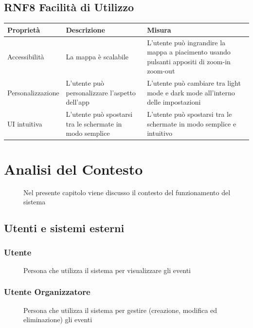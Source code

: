 \documentclass{article}
\let\origthesubsection\thesubsection
\begin{document}
\subsection{RNF8 Facilità di Utilizzo}
\begin{center}
    \begin{longtable}{|p{4cm}|p{8cm}|p{4cm}|}
        \hline
        Proprietà         & Descrizione                                              & Misura                                                                                     \\
        \hline
        Accessibilità     & La mappa è scalabile                                     & L'utente può ingrandire la mappa a piacimento usando pulsanti appositi di zoom-in zoom-out \\
        \hline
        Personalizzazione & L'utente può personalizzare l'aspetto dell'app           & L'utente può cambiare tra light mode e dark mode all'interno delle impostazioni            \\
        \hline
        UI intuitiva      & L'utente può spostarsi tra le schermate in modo semplice & L'utente può spostarsi tra le schermate in modo semplice e intuitivo                       \\
        \hline
    \end{longtable}
\end{center}
\renewcommand\thesubsection{\origthesubsection}
\clearpage
\section{Analisi del Contesto}
\begin{description}
    \item[] Nel presente capitolo viene discusso il contesto del funzionamento del sistema
\end{description}
\subsection{Utenti e sistemi esterni}
\subsubsection{Utente}
\begin{description}
    \item[] Persona che utilizza il sistema per visualizzare gli eventi
\end{description}
\subsubsection{Utente Organizzatore}
\begin{description}
    \item[] Persona che utilizza il sistema per gestire (creazione, modifica ed eliminazione) gli eventi
\end{description}
\end{document}
